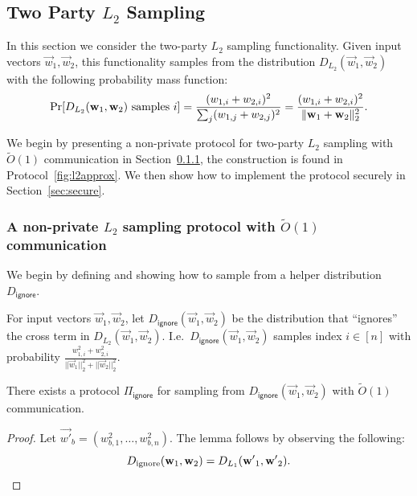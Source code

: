 \subsection{Two Party $L_2$ Sampling}\label{sec:l2}
In this section we consider the two-party $L_2$ sampling
functionality.
Given input vectors $\vec{w}_1, \vec{w}_2$,
this functionality samples from the distribution
$D_{L_2}(\vec{w}_1, \vec{w}_2)$ with the following
probability mass function:
$$\Pr[ D_{L_2}(\mathbf{w}_1, \mathbf{w}_2) \mbox{ samples } i ] 
= \frac{(w_{1,i} + w_{2,i})^2}{ \sum_j (w_{1,j} + w_{2,j})^2 }
= \frac{(w_{1,i} + w_{2,i})^2}{ \| \mathbf{w}_1 + \mathbf{w}_2 \|_2^2 }. $$

We begin by presenting a non-private protocol for two-party $L_2$
sampling with $\tilde{O}(1)$ communication in
Section~\ref{sec:insecure}, the construction is found in Protocol~\ref{fig:l2approx}. We then show how to implement the protocol
securely in Section~\ref{sec:secure}.

\subsubsection{A non-private $L_2$ sampling protocol with $\tilde{O}(1)$
communication} \label{sec:insecure}

We begin by defining and showing how to sample from a helper
distribution $D_{\mathsf{ignore}}$.

\begin{definition}
For input vectors $\vec{w}_1, \vec{w}_2$,
let $D_{\mathsf{ignore}}(\vec{w}_1, \vec{w}_2)$ be the distribution that ``ignores'' the cross term in $D_{L_2}(\vec{w}_1, \vec{w}_2)$.
I.e.~$D_{\mathsf{ignore}}(\vec{w}_1, \vec{w}_2)$
samples index $i \in [n]$
with probability $\frac{w^2_{1,i} + w^2_{2,i}}{||\vec{w}_1||_2^2 + ||\vec{w}_2||_2^2}$.
\end{definition}

\begin{lemma}\label{lem:ignore}
There exists a protocol $\Pi_{\mathsf{ignore}}$ for sampling from
$D_{\mathsf{ignore}}(\vec{w}_1, \vec{w}_2)$ with $\tilde{O}(1)$
communication.
\end{lemma}

\begin{proof}
Let $\vec{w'}_b = (w_{b,1}^2, \ldots, w_{b,n}^2).$
The lemma follows by observing the following:
$$D_{\mathrm{ignore}}(\mathbf{w}_1, \mathbf{w}_2) = D_{L_1}(\mathbf{w'}_1, \mathbf{w'}_2).$$ 
\end{proof}

